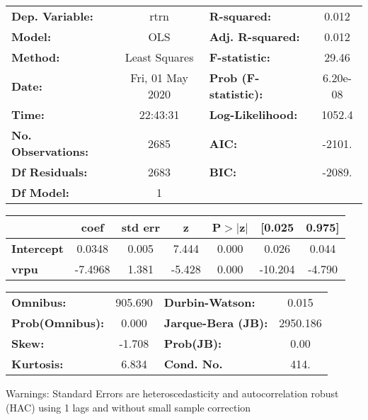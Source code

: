\begin{center}
\begin{tabular}{lclc}
\toprule
\textbf{Dep. Variable:}    &       rtrn       & \textbf{  R-squared:         } &     0.012   \\
\textbf{Model:}            &       OLS        & \textbf{  Adj. R-squared:    } &     0.012   \\
\textbf{Method:}           &  Least Squares   & \textbf{  F-statistic:       } &     29.46   \\
\textbf{Date:}             & Fri, 01 May 2020 & \textbf{  Prob (F-statistic):} &  6.20e-08   \\
\textbf{Time:}             &     22:43:31     & \textbf{  Log-Likelihood:    } &    1052.4   \\
\textbf{No. Observations:} &        2685      & \textbf{  AIC:               } &    -2101.   \\
\textbf{Df Residuals:}     &        2683      & \textbf{  BIC:               } &    -2089.   \\
\textbf{Df Model:}         &           1      & \textbf{                     } &             \\
\bottomrule
\end{tabular}
\begin{tabular}{lcccccc}
                   & \textbf{coef} & \textbf{std err} & \textbf{z} & \textbf{P$> |$z$|$} & \textbf{[0.025} & \textbf{0.975]}  \\
\midrule
\textbf{Intercept} &       0.0348  &        0.005     &     7.444  &         0.000        &        0.026    &        0.044     \\
\textbf{vrpu}      &      -7.4968  &        1.381     &    -5.428  &         0.000        &      -10.204    &       -4.790     \\
\bottomrule
\end{tabular}
\begin{tabular}{lclc}
\textbf{Omnibus:}       & 905.690 & \textbf{  Durbin-Watson:     } &    0.015  \\
\textbf{Prob(Omnibus):} &   0.000 & \textbf{  Jarque-Bera (JB):  } & 2950.186  \\
\textbf{Skew:}          &  -1.708 & \textbf{  Prob(JB):          } &     0.00  \\
\textbf{Kurtosis:}      &   6.834 & \textbf{  Cond. No.          } &     414.  \\
\bottomrule
\end{tabular}
\end{center}

Warnings: \newline
 [1] Standard Errors are heteroscedasticity and autocorrelation robust (HAC) using 1 lags and without small sample correction